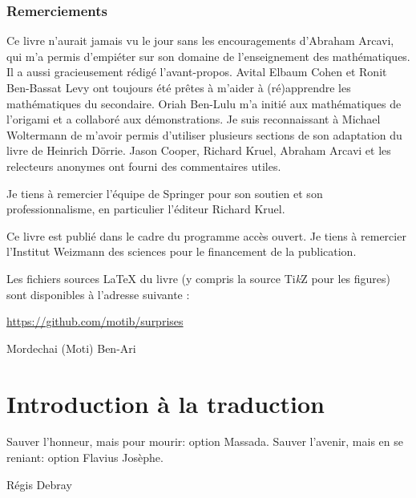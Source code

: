 \subsection*{Remerciements}

Ce livre n'aurait jamais vu le jour sans les encouragements d'Abraham Arcavi, qui m'a permis d'empiéter sur son domaine de l'enseignement des mathématiques. Il a aussi gracieusement rédigé l'avant-propos. Avital Elbaum Cohen et Ronit Ben-Bassat Levy ont toujours été prêtes à m'aider à (ré)apprendre les mathématiques du secondaire. Oriah Ben-Lulu m'a initié aux mathématiques de l'origami et a collaboré aux démonstrations. Je suis reconnaissant à Michael Woltermann de m'avoir permis d'utiliser plusieurs sections de son adaptation du livre de Heinrich D\"{o}rrie. Jason Cooper, Richard Kruel, Abraham Arcavi et les relecteurs anonymes ont fourni des commentaires utiles.

Je tiens à remercier l'équipe de Springer pour son soutien et son professionnalisme, en particulier l'éditeur Richard Kruel.

Ce livre est publié dans le cadre du programme \og accès ouvert\fg{}. Je tiens à remercier l'Institut Weizmann des sciences pour le financement de la publication.

Les fichiers sources \LaTeX{} du livre (y compris la source Ti\textit{k}Z pour les figures) sont disponibles à l'adresse suivante :
\begin{center}
\url{https://github.com/motib/surprises}
\end{center}

\medskip

\begin{flushright}
{Mordechai (Moti) Ben-Ari}
\end{flushright}

\newpage

\rhead[\fancyplain{}{}]%
{\fancyplain{}{\thepage}}
\cfoot{}
\pagestyle{fancyplain}

\chapter*{Introduction à la traduction}

\epigraph{Sauver l'honneur, mais pour mourir: option Massada. Sauver l'avenir, mais en se reniant: option Flavius \mbox{Josèphe}.}{Régis Debray \cite{Debray}} 

